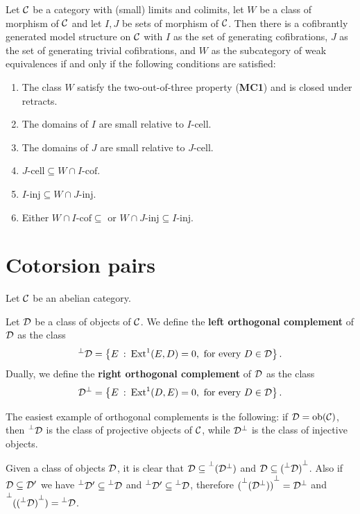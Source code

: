\begin{theorem}
	Let $\mathcal{C}$ be a category with (small) limits and colimits, let $W$ be a class of morphism of $\mathcal{C}$ and let $I,J$ be sets of morphism of $\mathcal{C}$. Then there is a cofibrantly generated model structure on $\mathcal{C}$ with $I$ as the set of generating cofibrations, $J$ as the set of generating trivial cofibrations, and $W$ as the subcategory of weak equivalences if and only if the following conditions are satisfied:
	\begin{enumerate}
		\item The class $W$ satisfy the two-out-of-three property (\textbf{MC1}) and is closed under retracts.
		\item The domains of $I$ are small relative to $I$-cell.
		\item The domains of $J$ are small relative to $J$-cell.
		\item $J\text{-cell} \subseteq W \cap I\text{-cof}$.
		\item $I\text{-inj} \subseteq W \cap J\text{-inj}$.
		\item Either $W \cap I\text{-cof} \subseteq $ or $ W \cap J\text{-inj} \subseteq I\text{-inj} $.
	\end{enumerate}
\end{theorem}

\section{Cotorsion pairs}
Let $\mathcal{C}$ be an abelian category.

\begin{definition}
	Let $\mathcal{D}$ be a class of objects of $\mathcal{C}$. We define the \textbf{left orthogonal complement} of $\mathcal{D}$ as the class
	\[ \prescript{\perp}{}{\mathcal{D}} = \left\{ E \: : \:  \mathrm{Ext}^1(E,D) = 0, \text{ for every } D \in \mathcal{D}\right\}.\]
	Dually, we define the \textbf{right orthogonal complement} of $\mathcal{D}$ as the class
	\[ {\mathcal{D}}^\perp = \left\{ E \: : \:  \mathrm{Ext}^1(D,E) = 0, \text{ for every } D \in \mathcal{D}\right\}.\]
\end{definition}
The easiest example of orthogonal complements is the following: if $\mathcal{D} = \mathrm{ob}(\mathcal{C})$, then $\prescript{\perp}{}{\mathcal{D}}$ is the class of projective objects of $\mathcal{C}$, while ${\mathcal{D}}^\perp$ is the class of injective objects.

\begin{remark}
	Given a class of objects $\mathcal{D}$, it is clear that $\mathcal{D}\subseteq \prescript{\perp}{}{({\mathcal{D}}^\perp)}$ and $\mathcal{D}\subseteq {(\prescript{\perp}{}{\mathcal{D}})}^\perp$. Also if $\mathcal{D}\subseteq \mathcal{D}'$ we have $\prescript{\perp}{}{\mathcal{D}}' \subseteq \prescript{\perp}{}{\mathcal{D}}$ and $\prescript{\perp}{}{\mathcal{D}}' \subseteq \prescript{\perp}{}{\mathcal{D}}$, therefore ${(\prescript{\perp}{}{({\mathcal{D}}^\perp)})}^\perp = {\mathcal{D}}^\perp$ and $\prescript{\perp}{}{({(\prescript{\perp}{}{\mathcal{D}})}^\perp)} = \prescript{\perp}{}{\mathcal{D}}$.
\end{remark}


